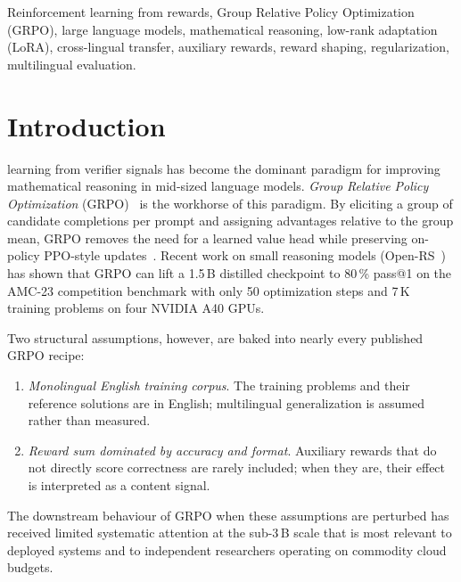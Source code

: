 \documentclass[journal,onecolumn,11pt]{IEEEtran}
\begin{document}
\begin{IEEEkeywords}
Reinforcement learning from rewards, Group Relative Policy Optimization
(GRPO), large language models, mathematical reasoning, low-rank adaptation
(LoRA), cross-lingual transfer, auxiliary rewards, reward shaping,
regularization, multilingual evaluation.
\end{IEEEkeywords}

\section{Introduction}
\label{sec:intro}

 learning from verifier signals has become the
dominant paradigm for improving mathematical reasoning in mid-sized language
models. \emph{Group Relative Policy Optimization} (GRPO)~\cite{deepseekmath_2024,
deepseekR1_2025} is the workhorse of this paradigm. By eliciting a group of
candidate completions per prompt and assigning advantages relative to the group
mean, GRPO removes the need for a learned value head while preserving on-policy
PPO-style updates~\cite{schulman2017ppo}. Recent work on small reasoning models
(Open-RS~\cite{openRS_2025}) has shown that GRPO can lift a 1.5\,B distilled
checkpoint to 80\,\% pass@1 on the AMC-23 competition benchmark with only 50
optimization steps and 7\,K training problems on four NVIDIA A40 GPUs.

Two structural assumptions, however, are baked into nearly every published
GRPO recipe:
\begin{enumerate}
\item \emph{Monolingual English training corpus}. The training problems and
their reference solutions are in English; multilingual generalization is
assumed rather than measured.
\item \emph{Reward sum dominated by accuracy and format}. Auxiliary rewards
that do not directly score correctness are rarely included; when they are,
their effect is interpreted as a content signal.
\end{enumerate}
The downstream behaviour of GRPO when these assumptions are perturbed has
received limited systematic attention at the sub-3\,B scale that is most
relevant to deployed systems and to independent researchers operating on
commodity cloud budgets.
\end{document}
